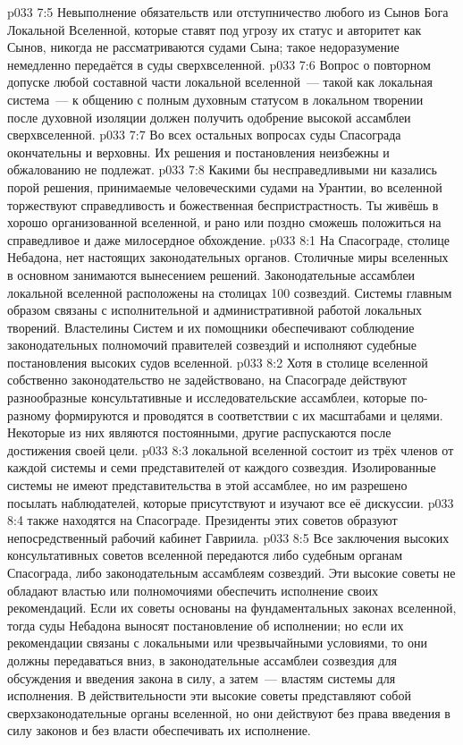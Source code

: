\vs p033 7:5 Невыполнение обязательств или отступничество любого из Сынов Бога Локальной Вселенной, которые ставят под угрозу их статус и авторитет как Сынов, никогда не рассматриваются судами Сына; такое недоразумение немедленно передаётся в суды сверхвселенной.
\vs p033 7:6 Вопрос о повторном допуске любой составной части локальной вселенной~--- такой как локальная система~--- к общению с полным духовным статусом в локальном творении после духовной изоляции должен получить одобрение высокой ассамблеи сверхвселенной.
\vs p033 7:7 \pc Во всех остальных вопросах суды Спасограда окончательны и верховны. Их решения и постановления неизбежны и обжалованию не подлежат.
\vs p033 7:8 Какими бы несправедливыми ни казались порой решения, принимаемые человеческими судами на Урантии, во вселенной торжествуют справедливость и божественная беспристрастность. Ты живёшь в хорошо организованной вселенной, и рано или поздно сможешь положиться на справедливое и даже милосердное обхождение.
\vs p033 8:1 На Спасограде, столице Небадона, нет настоящих законодательных органов. Столичные миры вселенных в основном занимаются вынесением решений. Законодательные ассамблеи локальной вселенной расположены на столицах 100 созвездий. Системы главным образом связаны с исполнительной и административной работой локальных творений. Властелины Систем и их помощники обеспечивают соблюдение законодательных полномочий правителей созвездий и исполняют судебные постановления высоких судов вселенной.
\vs p033 8:2 Хотя в столице вселенной собственно законодательство не задействовано, на Спасограде действуют разнообразные консультативные и исследовательские ассамблеи, которые по\hyp{}разному формируются и проводятся в соответствии с их масштабами и целями. Некоторые из них являются постоянными, другие распускаются после достижения своей цели.
\vs p033 8:3 \pc {} локальной вселенной состоит из трёх членов от каждой системы и семи представителей от каждого созвездия. Изолированные системы не имеют представительства в этой ассамблее, но им разрешено посылать наблюдателей, которые присутствуют и изучают все её дискуссии.
\vs p033 8:4 \pc {} также находятся на Спасограде. Президенты этих советов образуют непосредственный рабочий кабинет Гавриила.
\vs p033 8:5 \pc Все заключения высоких консультативных советов вселенной передаются либо судебным органам Спасограда, либо законодательным ассамблеям созвездий. Эти высокие советы не обладают властью или полномочиями обеспечить исполнение своих рекомендаций. Если их советы основаны на фундаментальных законах вселенной, тогда суды Небадона выносят постановление об исполнении; но если их рекомендации связаны с локальными или чрезвычайными условиями, то они должны передаваться вниз, в законодательные ассамблеи созвездия для обсуждения и введения закона в силу, а затем~--- властям системы для исполнения. В действительности эти высокие советы представляют собой сверхзаконодательные органы вселенной, но они действуют без права введения в силу законов и без власти обеспечивать их исполнение.
